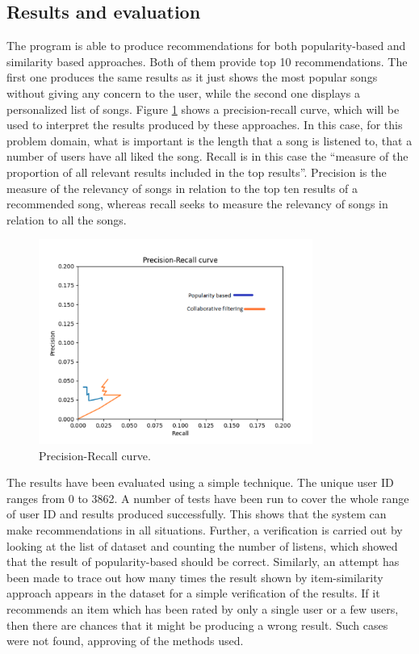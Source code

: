\documentclass{jot}
\begin{document}
\subsection{Results and evaluation}
The program is able to produce recommendations for both popularity-based and similarity based approaches. Both of them provide top 10 recommendations. The first one produces the same results as it just shows the most popular songs without giving any concern to the user, while the second one displays a personalized  list of songs.
Figure \ref{fig:evaluation} shows a precision-recall curve, which will be used to interpret the results produced by these approaches. In this case, for this problem domain, what is important is the length that a song is listened to, that a number of users have all liked the song. Recall is in this case the “measure of the proportion of all relevant results included in the top results”. Precision is the measure  of the relevancy of songs in relation to the top ten results of a recommended song, whereas recall seeks to measure the relevancy of songs in relation to all the songs.\\

\begin{figure}[h!]
    \centering%
    \includegraphics[width=0.8\textwidth]{evaluation}
    \caption{Precision-Recall curve.}
    \label{fig:evaluation}
\end{figure}%

The results have been evaluated using a simple technique. The unique user ID ranges from 0 to 3862. A number of tests have been run to cover the whole range of user ID and results produced successfully. This shows that the system can make recommendations in all situations. Further, a verification is carried out by looking at the list of dataset and counting the number of listens, which showed that the result of popularity-based should be correct.
Similarly, an attempt has been made to trace out how many times the result shown by item-similarity approach appears in the dataset for a simple verification of the results. If it recommends an item which has been rated by only a single user or a few users, then there are chances that it might be producing a wrong result. Such cases were not found, approving of the methods used.
\end{document}
